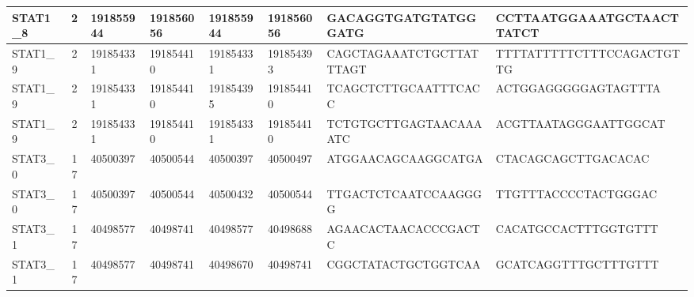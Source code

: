 \begin{landscape}
\begin{longtable}{| p{} | p{} | p{} | p{} | p{} | p{} | p{} | p{} |}
\multicolumn{1}{|l|}{STAT1\_8}   & \multicolumn{1}{c|}{2}  & \multicolumn{1}{l|}{191855944} & \multicolumn{1}{l|}{191856056} & \multicolumn{1}{l|}{191855944} & \multicolumn{1}{l|}{191856056} & \multicolumn{1}{l|}{GACAGGTGATGTATGGGATG}            & \multicolumn{1}{l|}{CCTTAATGGAAATGCTAACTTATCT}     \\ \hline
\multicolumn{1}{|l|}{STAT1\_9}   & \multicolumn{1}{c|}{2}  & \multicolumn{1}{l|}{191854331} & \multicolumn{1}{l|}{191854410} & \multicolumn{1}{l|}{191854331} & \multicolumn{1}{l|}{191854393} & \multicolumn{1}{l|}{CAGCTAGAAATCTGCTTATTTAGT}        & \multicolumn{1}{l|}{TTTTATTTTTCTTTCCAGACTGTTG}     \\ \hline
\multicolumn{1}{|l|}{STAT1\_9}   & \multicolumn{1}{c|}{2}  & \multicolumn{1}{l|}{191854331} & \multicolumn{1}{l|}{191854410} & \multicolumn{1}{l|}{191854395} & \multicolumn{1}{l|}{191854410} & \multicolumn{1}{l|}{TCAGCTCTTGCAATTTCACC}            & \multicolumn{1}{l|}{ACTGGAGGGGGAGTAGTTTA}          \\ \hline
\multicolumn{1}{|l|}{STAT1\_9}   & \multicolumn{1}{c|}{2}  & \multicolumn{1}{l|}{191854331} & \multicolumn{1}{l|}{191854410} & \multicolumn{1}{l|}{191854331} & \multicolumn{1}{l|}{191854410} & \multicolumn{1}{l|}{TCTGTGCTTGAGTAACAAAATC}          & \multicolumn{1}{l|}{ACGTTAATAGGGAATTGGCAT}         \\ \hline
\multicolumn{1}{|l|}{STAT3\_0}   & \multicolumn{1}{c|}{17} & \multicolumn{1}{l|}{40500397}  & \multicolumn{1}{l|}{40500544}  & \multicolumn{1}{l|}{40500397}  & \multicolumn{1}{l|}{40500497}  & \multicolumn{1}{l|}{ATGGAACAGCAAGGCATGA}             & \multicolumn{1}{l|}{CTACAGCAGCTTGACACAC}           \\ \hline
\multicolumn{1}{|l|}{STAT3\_0}   & \multicolumn{1}{c|}{17} & \multicolumn{1}{l|}{40500397}  & \multicolumn{1}{l|}{40500544}  & \multicolumn{1}{l|}{40500432}  & \multicolumn{1}{l|}{40500544}  & \multicolumn{1}{l|}{TTGACTCTCAATCCAAGGGG}            & \multicolumn{1}{l|}{TTGTTTACCCCTACTGGGAC}          \\ \hline
\multicolumn{1}{|l|}{STAT3\_1}   & \multicolumn{1}{c|}{17} & \multicolumn{1}{l|}{40498577}  & \multicolumn{1}{l|}{40498741}  & \multicolumn{1}{l|}{40498577}  & \multicolumn{1}{l|}{40498688}  & \multicolumn{1}{l|}{AGAACACTAACACCCGACTC}            & \multicolumn{1}{l|}{CACATGCCACTTTGGTGTTT}          \\ \hline
\multicolumn{1}{|l|}{STAT3\_1}   & \multicolumn{1}{c|}{17} & \multicolumn{1}{l|}{40498577}  & \multicolumn{1}{l|}{40498741}  & \multicolumn{1}{l|}{40498670}  & \multicolumn{1}{l|}{40498741}  & \multicolumn{1}{l|}{CGGCTATACTGCTGGTCAA}             & \multicolumn{1}{l|}{GCATCAGGTTTGCTTTGTTT}          \\ \hline

\end{longtable}
\end{landscape}
